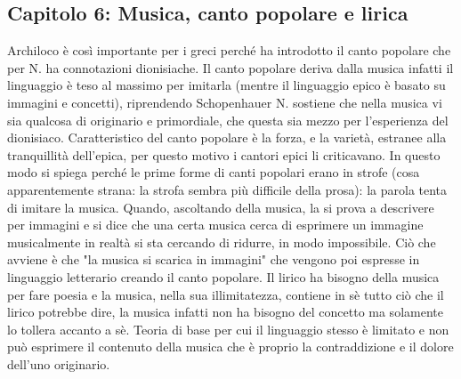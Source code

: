 \documentclass[10pt,a4paper]{article}
\begin{document}
\subsection{Capitolo 6: Musica, canto popolare e lirica}
Archiloco è così importante per i greci perché ha introdotto il canto popolare che per N. ha connotazioni dionisiache. Il canto popolare deriva dalla musica infatti il linguaggio è teso al massimo per imitarla (mentre il linguaggio epico è basato su immagini e concetti), riprendendo Schopenhauer N. sostiene che nella musica vi sia qualcosa di originario e primordiale, che questa sia mezzo per l'esperienza del dionisiaco. Caratteristico del canto popolare è la forza, e la varietà, estranee alla tranquillità dell'epica, per questo motivo i cantori epici li criticavano. In questo modo si spiega perché le prime forme di canti popolari erano in strofe (cosa apparentemente strana: la strofa sembra più difficile della prosa): la parola tenta di imitare la musica. Quando, ascoltando della musica, la si prova a descrivere per immagini e si dice che una certa musica cerca di esprimere un immagine musicalmente in realtà si sta cercando di ridurre, in modo impossibile. Ciò che avviene è che "la musica si scarica in immagini" che vengono poi espresse in linguaggio letterario creando il canto popolare. Il lirico ha bisogno della musica per fare poesia e la musica, nella sua illimitatezza, contiene in sè tutto ciò che il lirico potrebbe dire, la musica infatti non ha bisogno del concetto ma solamente lo tollera accanto a sè. Teoria di base per cui il linguaggio stesso è limitato e non può esprimere il contenuto della musica che è proprio la contraddizione e il dolore dell'uno originario.
\end{document}
